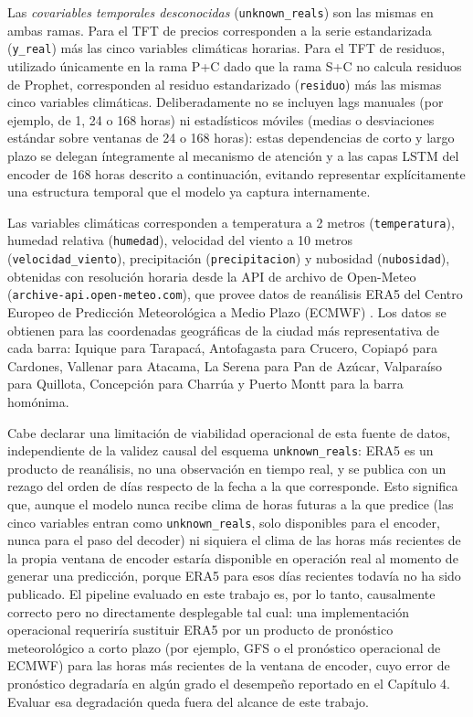 Las \textit{covariables temporales desconocidas} (\texttt{unknown\_reals}) son las mismas en ambas ramas. Para el TFT de precios corresponden a la serie estandarizada (\texttt{y\_real}) más las cinco variables climáticas horarias. Para el TFT de residuos, utilizado únicamente en la rama P+C dado que la rama S+C no calcula residuos de Prophet, corresponden al residuo estandarizado (\texttt{residuo}) más las mismas cinco variables climáticas. Deliberadamente no se incluyen lags manuales (por ejemplo, de 1, 24 o 168 horas) ni estadísticos móviles (medias o desviaciones estándar sobre ventanas de 24 o 168 horas): estas dependencias de corto y largo plazo se delegan íntegramente al mecanismo de atención y a las capas LSTM del encoder de 168 horas descrito a continuación, evitando representar explícitamente una estructura temporal que el modelo ya captura internamente.

Las variables climáticas corresponden a temperatura a 2 metros (\texttt{temperatura}), humedad relativa (\texttt{humedad}), velocidad del viento a 10 metros (\texttt{velocidad\_viento}), precipitación (\texttt{precipitacion}) y nubosidad (\texttt{nubosidad}), obtenidas con resolución horaria desde la API de archivo de Open-Meteo (\texttt{archive-api.open-meteo.com}), que provee datos de reanálisis ERA5 del Centro Europeo de Predicción Meteorológica a Medio Plazo (ECMWF) \cite{Hersbach2020ERA5}. Los datos se obtienen para las coordenadas geográficas de la ciudad más representativa de cada barra: Iquique para Tarapacá, Antofagasta para Crucero, Copiapó para Cardones, Vallenar para Atacama, La Serena para Pan de Azúcar, Valparaíso para Quillota, Concepción para Charrúa y Puerto Montt para la barra homónima.

Cabe declarar una limitación de viabilidad operacional de esta fuente de datos, independiente de la validez causal del esquema \texttt{unknown\_reals}: ERA5 es un producto de reanálisis, no una observación en tiempo real, y se publica con un rezago del orden de días respecto de la fecha a la que corresponde. Esto significa que, aunque el modelo nunca recibe clima de horas futuras a la que predice (las cinco variables entran como \texttt{unknown\_reals}, solo disponibles para el encoder, nunca para el paso del decoder) ni siquiera el clima de las horas más recientes de la propia ventana de encoder estaría disponible en operación real al momento de generar una predicción, porque ERA5 para esos días recientes todavía no ha sido publicado. El pipeline evaluado en este trabajo es, por lo tanto, causalmente correcto pero no directamente desplegable tal cual: una implementación operacional requeriría sustituir ERA5 por un producto de pronóstico meteorológico a corto plazo (por ejemplo, GFS o el pronóstico operacional de ECMWF) para las horas más recientes de la ventana de encoder, cuyo error de pronóstico degradaría en algún grado el desempeño reportado en el Capítulo 4. Evaluar esa degradación queda fuera del alcance de este trabajo.

